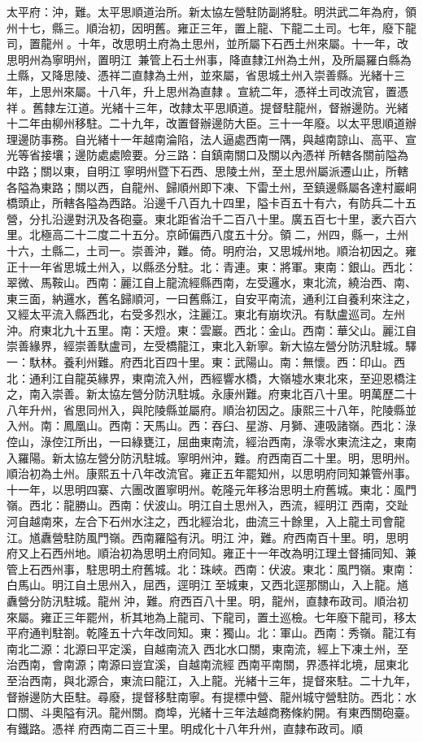\begin{pinyinscope}
太平府：沖，難。太平思順道治所。新太協左營駐防副將駐。明洪武二年為府，領州十七，縣三。順治初，因明舊。雍正三年，置上龍、下龍二土司。七年，廢下龍司，置龍州。十年，改思明土府為土思州，並所屬下石西土州來屬。十一年，改思明州為寧明州，置明江，兼管上石土州事，降直隸江州為土州，及所屬羅白縣為土縣，又降思陵、憑祥二直隸為土州，並來屬，省思城土州入崇善縣。光緒十三年，上思州來屬。十八年，升上思州為直隸。宣統二年，憑祥土司改流官，置憑祥。舊隸左江道。光緒十三年，改隸太平思順道。提督駐龍州，督辦邊防。光緒十二年由柳州移駐。二十九年，改置督辦邊防大臣。三十一年廢。以太平思順道辦理邊防事務。自光緒十一年越南淪陷，法人逼處西南一隅，與越南諒山、高平、宣光等省接壤；邊防處處險要。分三路：自鎮南關口及關以內憑祥所轄各關前隘為中路；關以東，自明江寧明州暨下石西、思陵土州，至土思州屬派遷山止，所轄各隘為東路；關以西，自龍州、歸順州即下凍、下雷土州，至鎮邊縣屬各達村巖峒橋頭止，所轄各隘為西路。沿邊千八百九十四里，隘卡百五十有六，有防兵二十五營，分扎沿邊對汛及各砲臺。東北距省治千二百八十里。廣五百七十里，袤六百六里。北極高二十二度二十五分。京師偏西八度五十分。領二，州四，縣一，土州十六，土縣二，土司一。崇善沖，難。倚。明府治，又思城州地。順治初因之。雍正十一年省思城土州入，以縣丞分駐。北：青連。東：將軍。東南：銀山。西北：翠微、馬鞍山。西南：麗江自上龍流經縣西南，左受邏水，東北流，繞治西、南、東三面，納邏水，舊名歸順河，一曰舊縣江，自安平南流，通利江自養利來注之，又經太平流入縣西北，右受多烈水，注麗江。東北有崩坎汛。有馱盧巡司。左州沖。府東北九十五里。南：天燈。東：雲巖。西北：金山。西南：華父山。麗江自崇善緣界，經崇善馱盧司，左受橋龍江，東北入新寧。新大協左營分防汛駐城。驛一：馱林。養利州難。府西北百四十里。東：武陽山。南：無懷。西：印山。西北：通利江自龍英緣界，東南流入州，西經響水橋，大嶺墟水東北來，至迎恩橋注之，南入崇善。新太協左營分防汛駐城。永康州難。府東北百八十里。明萬歷二十八年升州，省思同州入，與陀陵縣並屬府。順治初因之。康熙三十八年，陀陵縣並入州。南：鳳凰山。西南：天馬山。西：吞臼、星游、月獅、連吸諸嶺。西北：淥倥山，淥倥江所出，一曰綠甕江，屈曲東南流，經治西南，淥零水東流注之，東南入羅陽。新太協左營分防汛駐城。寧明州沖，難。府西南百二十里。明，思明州。順治初為土州。康熙五十八年改流官。雍正五年罷知州，以思明府同知兼管州事。十一年，以思明四寨、六團改置寧明州。乾隆元年移治思明土府舊城。東北：風門嶺。西北：龍勝山。西南：伏波山。明江自土思州入，西流，經明江西南，交趾河自越南來，左合下石州水注之，西北經治北，曲流三十餘里，入上龍土司會龍江。馗纛營駐防風門嶺。西南羅隘有汛。明江沖，難。府西南百十里。明，思明府又上石西州地。順治初為思明土府同知。雍正十一年改為明江理土督捕同知、兼管上石西州事，駐思明土府舊城。北：珠峽。西南：伏波。東北：風門嶺。東南：白馬山。明江自土思州入，屈西，逕明江至城東，又西北逕那關山，入上龍。馗纛營分防汛駐城。龍州沖，難。府西百八十里。明，龍州，直隸布政司。順治初來屬。雍正三年罷州，析其地為上龍司、下龍司，置土巡檢。七年廢下龍司，移太平府通判駐劄。乾隆五十六年改同知。東：獨山。北：軍山。西南：秀嶺。龍江有南北二源：北源曰平定溪，自越南流入西北水口關，東南流，經上下凍土州，至治西南，會南源；南源曰豈宜溪，自越南流經西南平南關，界憑祥北境，屈東北至治西南，與北源合，東流曰龍江，入上龍。光緒十三年，提督來駐。二十九年，督辦邊防大臣駐。尋廢，提督移駐南寧。有提標中營、龍州城守營駐防。西北：水口關、斗奧隘有汛。龍州關。商埠，光緒十三年法越商務條約開。有東西關砲臺。有鐵路。憑祥府西南二百三十里。明成化十八年升州，直隸布政司。順
\end{pinyinscope}
